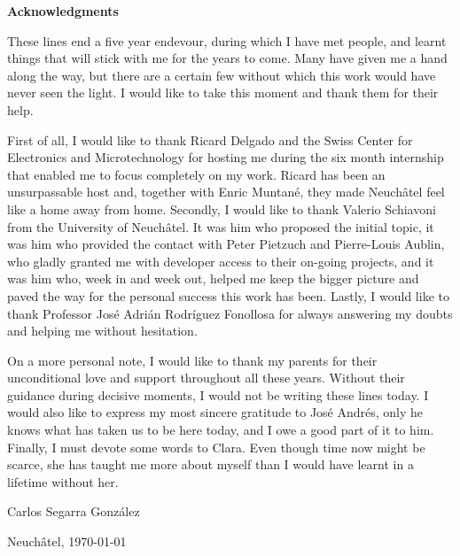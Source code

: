 \vspace*{2cm}
\Huge
\textbf{Acknowledgments} \label{sec:acknowledgments}
\normalsize

\vspace{1cm}

These lines end a five year endevour, during which I have met people, and learnt things that will stick with me for the years to come.
Many have given me a hand along the way, but there are a certain few without which this work would have never seen the light.
I would like to take this moment and thank them for their help.

First of all, I would like to thank Ricard Delgado and the Swiss Center for Electronics and Microtechnology for hosting me during the six month internship that enabled me to focus completely on my work.
Ricard has been an unsurpassable host and, together with Enric Muntan\'e, they made Neuch\^atel feel like a home away from home.
Secondly, I would like to thank Valerio Schiavoni from the University of Neuch\^atel.
It was him who proposed the initial topic, it was him who provided the contact with Peter Pietzuch and Pierre-Louis Aublin, who gladly granted me with developer access to their on-going projects, and it was him who, week in and week out, helped me keep the bigger picture and paved the way for the personal success this work has been.
Lastly, I would like to thank Professor Jos\'e Adri\'an Rodr\'iguez Fonollosa for always answering my doubts and helping me without hesitation.

On a more personal note, I would like to thank my parents for their unconditional love and support throughout all these years.
Without their guidance during decisive moments, I would not be writing these lines today.
I would also like to express my most sincere gratitude to Jos\'e Andr\'es, only he knows what has taken us to be here today, and I owe a good part of it to him.
Finally, I must devote some words to Clara.
Even though time now might be scarce, she has taught me more about myself than I would have learnt in a lifetime without her.

\vspace{1cm}

\begin{flushright}
Carlos Segarra Gonz\'alez

Neuch\^atel, \today
\end{flushright}

\vspace*{\fill}

